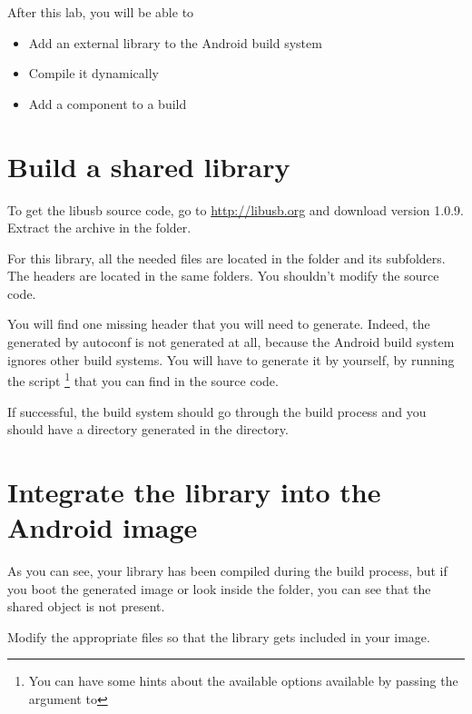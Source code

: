 
After this lab, you will be able to
\begin{itemize}
  \item Add an external library to the Android build system
  \item Compile it dynamically
  \item Add a component to a build
\end{itemize}

\section{Build a shared library}

To get the libusb source code, go to \url{http://libusb.org} and
download version 1.0.9. Extract the archive in the
 folder.

For this library, all the needed  files are located in the
 folder and its subfolders. The headers are located in
the same folders. You shouldn't modify the  source code.

You will find one missing header that you will need to
generate. Indeed, the  generated by autoconf is not
generated at all, because the Android build system ignores other build
systems. You will have to generate it by yourself, by running the
 script \footnote{You can have some hints about the
  available options available by passing the  argument to
  } that you can find in the  source
code.

If successful, the build system should go through the build process
and you should have a directory generated in the  directory.

\section{Integrate the library into the Android image}

As you can see, your library has been compiled during the build
process, but if you boot the generated image or look inside the
folder, you can see that the shared object is not present.

Modify the appropriate files so that the library gets included in your
image.
